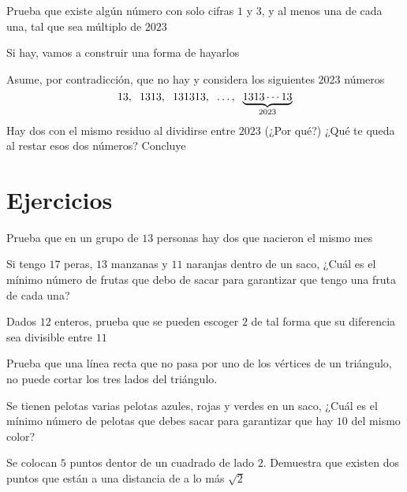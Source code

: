 \documentclass[11pt]{scrartcl}
\begin{document}
\begin{example}
    Prueba que existe algún número con solo cifras $1$ y $3$, y al menos una de cada una, tal que sea múltiplo de $2023$
\end{example}
\begin{walkthrough} Si hay, vamos a construir una forma de hayarlos
    \begin{walk}
        \ii Asume, por contradicción, que no hay y considera los siguientes $2023$ números
        \[13,\hspace{0.2cm} 1313,\hspace{0.2cm} 131313,\hspace{0.2cm} \ldots ,\hspace{0.2cm} \underbrace{1313\cdots 13}_{2023}\]
        \ii Hay dos con el mismo residuo al dividirse entre $2023$ (¿Por qué?)
        \ii ¿Qué te queda al restar esos dos números?
        \ii Concluye
    \end{walk}
\end{walkthrough}
\section{Ejercicios}
\begin{exercise}
    Prueba que en un grupo de $13$ personas hay dos que nacieron el mismo mes
\end{exercise}
\begin{exercise}
    Si tengo $17$ peras, $13$ manzanas y $11$ naranjas dentro de un saco, ¿Cuál es el mínimo número de frutas que debo de sacar para garantizar que tengo una fruta de cada una?
\end{exercise}
\begin{exercise}
    Dados $12$ enteros, prueba que se pueden escoger $2$ de tal forma que su diferencia sea divisible entre $11$
\end{exercise}
\begin{exercise}
    Prueba que una línea recta que no pasa por uno de los vértices de un triángulo, no puede cortar los tres lados del triángulo.
\end{exercise}
\begin{exercise}
    Se tienen pelotas varias pelotas azules, rojas y verdes en un saco, ¿Cuál es el mínimo número de pelotas que debes sacar para garantizar que hay $10$ del mismo color?
\end{exercise}
\begin{exercise}
    Se colocan $5$ puntos dentor de un cuadrado de lado $2$. Demuestra que existen dos puntos que están a una distancia
    de a lo más $\sqrt{2}$
\end{exercise}
\end{document}
